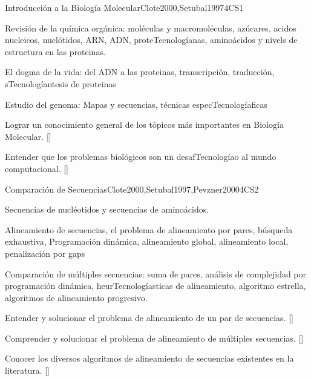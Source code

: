 \begin{syllabus}
\begin{unit}{Introducción a la Biología Molecular}{}{Clote2000,Setubal1997}{4}{CS1}
\begin{topics}
    \item Revisión de la química orgánica: moléculas y macromoléculas, azúcares, acidos nucleicos, nuclótidos, ARN, ADN, proteTecnologíanas, aminoácidos y nivels de estructura en las proteinas. 
    \item El dogma de la vida: del ADN a las proteinas, transcripción, traducción, sTecnologíantesis de proteinas
    \item Estudio del genoma: Mapas y secuencias, técnicas especTecnologíaficas
\end{topics}
\begin{learningoutcomes}
    \item  Lograr un conocimiento general de los tópicos más importantes en Biología Molecular. [\Familiarity]
    \item Entender que los problemas biológicos son un desafTecnologíao al mundo computacional. [\Assessment]
\end{learningoutcomes}
\end{unit}

\begin{unit}{Comparación de Secuencias}{}{Clote2000,Setubal1997,Pevzner2000}{4}{CS2}
\begin{topics}
    \item Secuencias de nucléotidos y secuencias de aminoácidos.
    \item Alineamiento de secuencias, el problema de alineamiento por pares, búsqueda exhaustiva, Programación dinámica, alineamiento global, alineamiento local, penalización por gaps
    \item Comparación de múltiples secuencias: suma de pares, análisis de complejidad por programación dinámica, heurTecnologíasticas de alineamiento, algoritmo estrella, algoritmos de alineamiento progresivo.
\end{topics}
\begin{learningoutcomes}
    \item  Entender y solucionar el problema de alineamiento de un par de secuencias. [\Usage]
    \item  Comprender y solucionar el problema de alineamiento de múltiples secuencias. [\Usage]
    \item Conocer los diversos algoritmos de alineamiento de secuencias existentes en la literatura. [\Familiarity]
\end{learningoutcomes}
\end{unit}


\end{syllabus}
